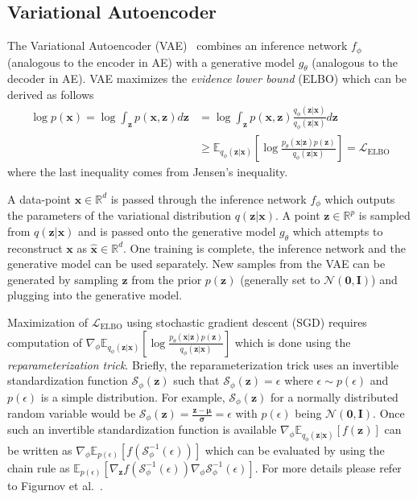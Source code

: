 \documentclass[runningheads]{llncs}
\begin{document}
\subsection{Variational Autoencoder}
The Variational Autoencoder (VAE)~\cite{kingma2013auto} combines an inference network $f_\phi$ (analogous to the encoder in AE) with a generative model $g_\theta$ (analogous to the decoder in AE). VAE maximizes the \textit{evidence lower bound} (ELBO) which can be derived as follows
\begin{align}
\log p(\mathbf{x}) = \log\int_{\mathbf{z}}p(\mathbf{x}, \mathbf{z})d\mathbf{z} &= \log\int_{\mathbf{z}}p(\mathbf{x}, \mathbf{z})\frac{q_\phi(\mathbf{z}|\mathbf{x})}{q_\phi(\mathbf{z}|\mathbf{x})}d\mathbf{z}\\
&\geq \mathbb{E}_{q_\phi(\mathbf{z}|\mathbf{x})}\left[\log\frac{p_\theta(\mathbf{x}| \mathbf{z})p(\mathbf{z})}{q_\phi(\mathbf{z}|\mathbf{x})}\right] = \mathcal{L}_{\mathrm{ELBO}}\label{eq:elbo}
\end{align}
where the last inequality comes from Jensen's inequality.

A data-point $\mathbf{x} \in \mathbb{R}^d$ is passed through the inference network $f_\phi$ which outputs the parameters of the variational distribution $q(\mathbf{z}|\mathbf{x})$. A point $\mathbf{z} \in \mathbb{R}^p$ is sampled from $q(\mathbf{z}|\mathbf{x})$ and is passed onto the generative model $g_\theta$ which attempts to reconstruct $\mathbf{x}$ as $\mathbf{\hat{x}} \in \mathbb{R}^d$. One training is complete, the inference network and the generative model can be used separately. New samples from the VAE can be generated by sampling $\mathbf{z}$ from the prior $p(\mathbf{z})$ (generally set to $\mathcal{N}(\bm{0}, \mathbf{I})$) and plugging into the generative model.

Maximization of $\mathcal{L}_{\mathrm{ELBO}}$ using stochastic gradient descent (SGD) requires computation of $\nabla_\phi \mathbb{E}_{q_\phi(\mathbf{z}|\mathbf{x})}\left[\log\frac{p_\theta(\mathbf{x}| \mathbf{z})p(\mathbf{z})}{q_\phi(\mathbf{z}|\mathbf{x})}\right]$ which is done using the \textit{reparameterization trick}. Briefly, the reparameterization trick uses an invertible standardization function $\mathcal{S}_{\phi}(\mathbf{z})$ such that $\mathcal{S}_{\phi}(\mathbf{z}) = \epsilon$ where $\epsilon \sim p(\epsilon)$ and $p(\epsilon)$ is a simple distribution. For example, $\mathcal{S}_{\phi}(\mathbf{z})$ for a normally distributed random variable would be $\mathcal{S}_{\phi}(\mathbf{z}) = \frac{\mathbf{z}-\bm{\mu}}{\bm{\sigma}} = \epsilon$ with $p(\epsilon)$ being $\mathcal{N}(\bm{0}, \mathbf{I})$. Once such an invertible standardization function is available $\nabla_\phi \mathbb{E}_{q_\phi(\mathbf{z}|\mathbf{x})}\left[f(\mathbf{z})\right]$ can be written as $\nabla_\phi \mathbb{E}_{p(\epsilon)}\left[f(\mathcal{S}_{\phi}^{-1}(\epsilon))\right]$ which can be evaluated by using the chain rule as $ \mathbb{E}_{p(\epsilon)}\left[\nabla_{\mathbf{z}}f(\mathcal{S}_{\phi}^{-1}(\epsilon))\nabla_\phi\mathcal{S}_{\phi}^{-1}(\epsilon)\right]$. For more details please refer to Figurnov et al.~\cite{figurnov2018implicit}.
\end{document}
